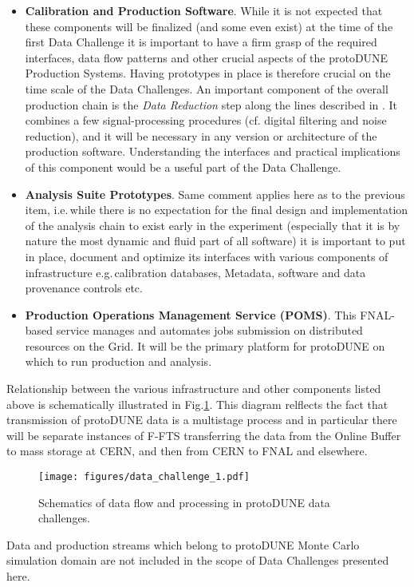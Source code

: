 \documentclass[pdftex,12pt,letter]{article}
\newcommand{\pd}{protoDUNE\xspace}
\begin{document}
\begin{itemize}
\item \textbf{Calibration and Production Software}. While it is not expected that these components will be finalized
(and some even exist) at the time of the first Data Challenge it is important to have a firm grasp of the required interfaces,
data flow patterns and other crucial aspects of the \pd Production Systems. Having prototypes in place is therefore crucial
on the time scale of the Data Challenges.
An important component of the overall production chain is the \textit{Data Reduction} step along the lines described
in \cite{docdb2089}. It combines a few signal-processing procedures (cf. digital filtering and noise reduction), and it will be
necessary in any version or architecture of the production software.
Understanding the interfaces and practical implications of this component would be a useful part of the Data Challenge.

\item \textbf{Analysis Suite Prototypes}. Same comment applies here as to the previous item, i.e.\,while there is no expectation
for the final design and implementation of the analysis chain to exist early in the experiment (especially that it is by nature the most
dynamic and fluid part of all software) it is important to put in place, document and optimize its interfaces with various components
of infrastructure e.g.\,calibration databases, Metadata, software and data provenance controls etc.

\item \textbf{Production Operations Management Service (POMS)}. This FNAL-based service \cite{poms} manages and automates jobs
submission on distributed resources on the Grid. It will be the primary platform for \pd on which to run production and analysis.


\end{itemize}
\noindent Relationship between the various infrastructure and other components listed above is schematically illustrated in
Fig.\ref{fig:dc1}. This diagram relflects the fact that transmission of \pd data is a multistage process and in particular there
will be separate instances of F-FTS transferring the data from the Online Buffer to mass storage at CERN, and then from
CERN to FNAL and elsewhere.

\begin{figure}[tbh]
  \centering
  \texttt{[image: figures/data\_challenge\_1.pdf]}
  \caption{Schematics of data flow and  processing in \pd data challenges.}
  \label{fig:dc1}
\end{figure}
\noindent Data and production streams which belong to \pd Monte Carlo simulation domain are not included in the
scope of Data Challenges presented here.
\end{document}
